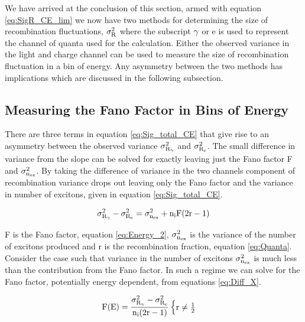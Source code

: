 We have arrived at the conclusion of this section, armed with equation \ref{eq:SigR_CE_lim} we now have two methods for determining the size of recombination fluctuations, $\rm\sigma_{R}^2$ where the subscript $\rm \gamma$ or e is used to represent the channel of quanta used for the calculation. Either the observed variance in the light and charge channel can be used to measure the size of recombination fluctuation in a bin of energy. Any asymmetry between the two methods has implications which are discussed in the following subsection.


\subsection{Measuring the Fano Factor in Bins of Energy}

There are three terms in equation \ref{eq:Sig_total_CE} that give rise to an asymmetry between the observed variance $\rm \sigma_{R_\gamma}^2$  and  $\rm \sigma_{R_e}^2$. The small difference in variance from the slope can be solved for exactly leaving just the Fano factor F and $\rm \sigma_{n_{ex}}^2$. By taking the difference of variance in the two channels component of recombination variance drops out leaving only the Fano factor and the variance in number of excitons, given in equation \ref{eq:Sig_total_CE}.

\begin{equation}
\rm \sigma_{R_\gamma}^2 - \sigma_{R_e}^2 = \sigma_{n_{ex}}^2 + n_iF(2r-1) 
\label{eq:Diff_X}
\end{equation}

F is the Fano factor, equation \ref{eq:Energy_2}, $\rm \sigma_{n_{ex}}^2$ is the variance of the number of excitons produced and r is the recombination fraction, equation \ref{eq:Quanta}. %
Consider the case such that variance in the number of excitons $\rm \sigma_{n_{ex}}^2$ is much less than the contribution from the Fano factor. In such a regime we can solve for the Fano factor, potentially energy dependent, from equations \ref{eq:Diff_X}.

\begin{equation}
\rm F(E)=\frac{\sigma_{R_\gamma}^2 - \sigma_{R_e}^2}{n_i(2r-1)}
\begin{cases} \rm r \neq \frac{1}{2}\\
\end{cases}
\label{eq:Fano}
\end{equation}

